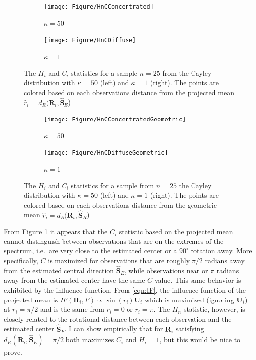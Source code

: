 \documentclass{article}\usepackage[]{graphicx}\usepackage[]{color}
\newcommand{\ProjMean}{{\widehat{\bm S}_{E}}}
\newcommand{\GeomMean}{{\widehat{\bm S}_{R}}}
\begin{document}
\begin{figure}
\centering
\begin{subfigure}[b]{0.45\textwidth}
        \texttt{[image: Figure/HnCConcentrated]}
        \caption{$\kappa=50$}
\end{subfigure}
\begin{subfigure}[b]{0.45\textwidth}
        \texttt{[image: Figure/HnCDiffuse]}
        \caption{$\kappa=1$}
        \label{fig:HnDiff}
\end{subfigure}
\caption{The $H_i$ and $C_i$ statistics for a sample $n=25$ from the Cayley distribution with $\kappa=50$ (left) and $\kappa=1$ (right).  The points are colored based on each observations distance from the projected mean $\hat r_i=d_R(\bm R_i,\ProjMean$)}
\label{fig:HnC}
\end{figure}

\begin{figure}
\centering
\begin{subfigure}[b]{0.45\textwidth}
        \texttt{[image: Figure/HnCConcentratedGeometric]}
        \caption{$\kappa=50$}
\end{subfigure}
\begin{subfigure}[b]{0.45\textwidth}
        \texttt{[image: Figure/HnCDiffuseGeometric]}
        \caption{$\kappa=1$}
        \label{fig:HnDiffGeom}
\end{subfigure}
\caption{The $H_i$ and $C_i$ statistics for a sample from $n=25$ the Cayley distribution with $\kappa=50$ (left) and $\kappa=1$ (right).  The points are colored based on each observations distance from the geometric mean $\hat r_i=d_R(\bm R_i,\GeomMean$)}
\label{fig:HnCGeom}
\end{figure}

From Figure \ref{fig:HnDiff} it appears that the $C_i$ statistic based on the projected mean cannot distinguish between observations that are on the extremes of the spectrum, i.e.~are very close to the estimated center or a $90^\circ$ rotation away.  More specifically, $C$ is maximized for observations that are roughly $\pi/2$ radians away from the estimated central direction $\ProjMean$, while observations near or $\pi$ radians away from the estimated center have the same $C$ value.  This same behavior is exhibited by the influence function.  From \eqref{eqn:IF}, the influence function of the projected mean is $IF(\bm R_i,F)\propto\sin(r_i)\bm U_i$ which is maximized (ignoring $\bm U_i$) at $r_i=\pi/2$ and is the same from $r_i=0$ or $r_i=\pi$.  The $H_n$ statistic, however, is closely related to the rotational distance between each observation and the estimated center $\ProjMean$.  I can show empirically that for $\bm R_i$ satisfying $d_R(\bm R_i,\ProjMean)=\pi/2$ both maximizes $C_i$ and $H_i=1$, but this would be nice to prove. 
\end{document}
